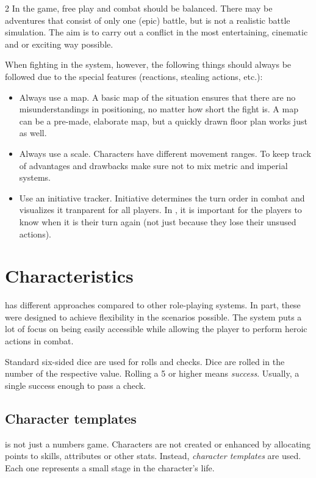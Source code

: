 \begin{multicols}{2}
In the game, free play and combat should be balanced. There may be adventures that consist of only one (epic) battle, but  is not a realistic battle simulation. The aim is to carry out a conflict in the most entertaining, cinematic and or exciting way possible.

When fighting in the \textit{} system, however, the following things should always be followed due to the special features (reactions, stealing actions, etc.): 

\begin{itemize}
    \item Always use a map. A basic map of the situation ensures that there are no misunderstandings in positioning, no matter how short the fight is. A map can be a pre-made, elaborate map, but a quickly drawn floor plan works just as well.
    \item Always use a scale. Characters have different movement ranges. To keep track of advantages and drawbacks make sure not to mix metric and imperial systems.
    \item Use an initiative tracker. Initiative determines the turn order in combat and visualizes it tranparent for all players. In , it is important for the players to know when it is their turn again (not just because they lose their unsused actions).
\end{itemize}

\section{Characteristics} 

 has different approaches compared to other role-playing systems. In part, these were designed to achieve flexibility in the scenarios possible. The system puts a lot of focus on being easily accessible while allowing the player to perform heroic actions in combat.

Standard six-sided dice are used for rolls and checks. Dice are rolled in the number of the respective value. Rolling a 5 or higher means \textit{success}. Usually, a single success enough to pass a check.

\subsection{Character templates} 

\textit{} is not just a numbers game. Characters are not created or enhanced by allocating points to skills, attributes or other stats. Instead, \textit{character templates} are used. Each one represents a small stage in the character's life.


\end{multicols}

